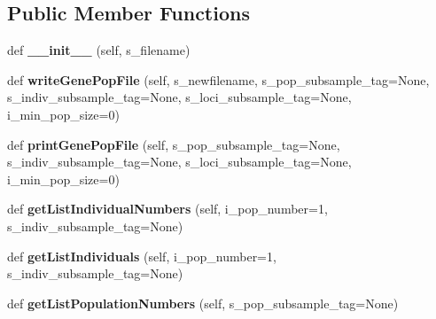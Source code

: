 \subsection*{Public Member Functions}
\begin{DoxyCompactItemize}
\item 
def {\bfseries \+\_\+\+\_\+init\+\_\+\+\_\+} (self, s\+\_\+filename)\hypertarget{classnegui_1_1genepopfilemanager_1_1GenepopFileManager_a8563b3299666d02d45c9acd64f450c51}{}\label{classnegui_1_1genepopfilemanager_1_1GenepopFileManager_a8563b3299666d02d45c9acd64f450c51}

\item 
def {\bfseries write\+Gene\+Pop\+File} (self, s\+\_\+newfilename, s\+\_\+pop\+\_\+subsample\+\_\+tag=None, s\+\_\+indiv\+\_\+subsample\+\_\+tag=None, s\+\_\+loci\+\_\+subsample\+\_\+tag=None, i\+\_\+min\+\_\+pop\+\_\+size=0)\hypertarget{classnegui_1_1genepopfilemanager_1_1GenepopFileManager_a7390cad5840454284e816679a87d84df}{}\label{classnegui_1_1genepopfilemanager_1_1GenepopFileManager_a7390cad5840454284e816679a87d84df}

\item 
def {\bfseries print\+Gene\+Pop\+File} (self, s\+\_\+pop\+\_\+subsample\+\_\+tag=None, s\+\_\+indiv\+\_\+subsample\+\_\+tag=None, s\+\_\+loci\+\_\+subsample\+\_\+tag=None, i\+\_\+min\+\_\+pop\+\_\+size=0)\hypertarget{classnegui_1_1genepopfilemanager_1_1GenepopFileManager_a35aa30c43ab4a5e7762bf8c722314727}{}\label{classnegui_1_1genepopfilemanager_1_1GenepopFileManager_a35aa30c43ab4a5e7762bf8c722314727}

\item 
def {\bfseries get\+List\+Individual\+Numbers} (self, i\+\_\+pop\+\_\+number=1, s\+\_\+indiv\+\_\+subsample\+\_\+tag=None)\hypertarget{classnegui_1_1genepopfilemanager_1_1GenepopFileManager_a652029f0a6e0668e0b75c9683dae0ffd}{}\label{classnegui_1_1genepopfilemanager_1_1GenepopFileManager_a652029f0a6e0668e0b75c9683dae0ffd}

\item 
def {\bfseries get\+List\+Individuals} (self, i\+\_\+pop\+\_\+number=1, s\+\_\+indiv\+\_\+subsample\+\_\+tag=None)\hypertarget{classnegui_1_1genepopfilemanager_1_1GenepopFileManager_aa6993dde24163002aeae55005437711d}{}\label{classnegui_1_1genepopfilemanager_1_1GenepopFileManager_aa6993dde24163002aeae55005437711d}

\item 
def {\bfseries get\+List\+Population\+Numbers} (self, s\+\_\+pop\+\_\+subsample\+\_\+tag=None)\hypertarget{classnegui_1_1genepopfilemanager_1_1GenepopFileManager_aa14e4cc93f6128be65081e2915969328}{}\label{classnegui_1_1genepopfilemanager_1_1GenepopFileManager_aa14e4cc93f6128be65081e2915969328}


\end{DoxyCompactItemize}
